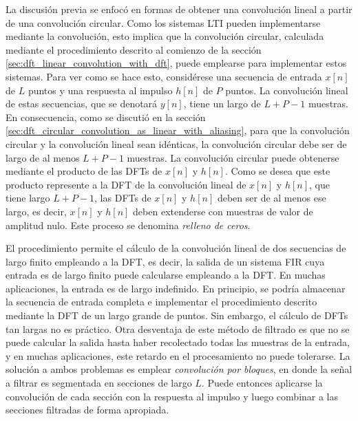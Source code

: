 \documentclass[a4paper]{report}
\begin{document}
La discusión previa se enfocó en formas de obtener una convolución lineal a partir de una convolución circular. Como los sistemas LTI pueden implementarse mediante la convolución, esto implica que la convolución circular, calculada mediante el procedimiento descrito al comienzo de la sección \ref{sec:dft_linear_convolution_with_dft}, puede emplearse para implementar estos sistemas. Para ver como se hace esto, considérese una secuencia de entrada \(x[n]\) de \(L\) puntos y una respuesta al impulso \(h[n]\) de \(P\) puntos. La convolución lineal de estas secuencias, que se denotará \(y[n]\), tiene un largo de \(L+P-1\) muestras. En consecuencia, como se discutió en la sección \ref{sec:dft_circular_convolution_as_linear_with_aliasing}, para que la convolución circular y la convolución lineal sean idénticas, la convolución circular debe ser de largo de al menos \(L+P-1\) muestras. La convolución circular puede obtenerse mediante el producto de las DFTs de \(x[n]\) y \(h[n]\). Como se desea que este producto represente a la DFT de la convolución lineal de \(x[n]\) y \(h[n]\), que tiene largo \(L+P-1\), las DFTs de \(x[n]\) y \(h[n]\) deben ser de al menos ese largo, es decir, \(x[n]\) y \(h[n]\) deben extenderse con muestras de valor de amplitud nulo. Este  proceso se denomina \emph{relleno de ceros}.

El procedimiento permite el cálculo de la convolución lineal de dos secuencias de largo finito empleando a la DFT, es decir, la salida de un sistema FIR cuya entrada es de largo finito puede calcularse empleando a la DFT. En muchas aplicaciones, la entrada es de largo indefinido. En principio, se podría almacenar la secuencia de entrada completa e implementar el procedimiento descrito mediante la DFT de un largo grande de puntos. Sin embargo, el cálculo de DFTs tan largas no es práctico. Otra desventaja de este método de filtrado es que no se puede calcular la salida hasta haber recolectado todas las muestras de la entrada, y en muchas aplicaciones, este retardo en el procesamiento no puede tolerarse. La solución a ambos problemas es emplear \emph{convolución por bloques}, en donde la señal a filtrar es segmentada en secciones de largo \(L\). Puede entonces aplicarse la convolución de cada sección con la respuesta al impulso y luego combinar a las secciones filtradas de forma apropiada.
\end{document}
